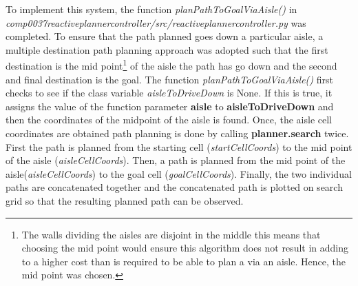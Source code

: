 \documentclass[a4paper,12pt]{article}
\begin{document}
	To implement this system, the function \textit{planPathToGoalViaAisle()} in \textit{comp0037\textunderscore reactive\textunderscore planner\textunderscore controller\slash src\slash reactive\textunderscore planner\textunderscore controller.py} was completed. To ensure that the path planned goes down a particular aisle, a multiple destination path planning approach was adopted such that the first destination is the mid point\footnote{The walls dividing the aisles are disjoint in the middle this means that choosing the mid point would ensure this algorithm does not result in adding to a higher cost than is required to be able to plan a via an aisle. Hence, the mid point was chosen.} of the aisle the path has go down and the second and final destination is the goal.
	The function \textit{planPathToGoalViaAisle()} first checks to see if the class variable \textit{aisleToDriveDown} is None. If this is true, it assigns the value of the function parameter \textbf{aisle} to \textbf{aisleToDriveDown} and then the coordinates of the midpoint of the aisle is found. Once, the aisle cell coordinates are obtained path planning is done by calling \textbf{planner.search} twice. First the path is planned from the starting cell (\textit{startCellCoords}) to the mid point of the aisle (\textit{aisleCellCoords}). Then, a path is planned from the mid point of the aisle(\textit{aisleCellCoords}) to the goal cell (\textit{goalCellCoords}). Finally, the two individual paths are concatenated together and the concatenated path is plotted on search grid so that the resulting planned path can be observed.
\end{document}
